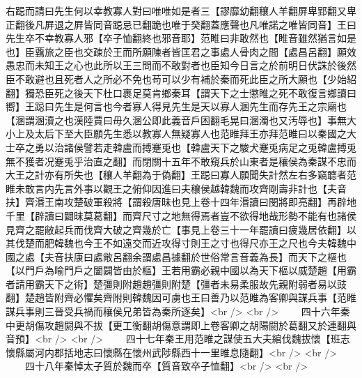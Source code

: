 右跽而請曰先生何以幸教寡人對曰唯唯如是者三【謬靡幼翻穰人羊翻屏卑郢翻又卑正翻後凡屛退之屛皆同音跽忌已翻跪也唯于癸翻蓋應聲也凡唯諾之唯皆同音】王曰先生卒不幸教寡人邪【卒子恤翻終也邪音耶】范睢曰非敢然也【睢音雖然猶言如是也】臣覊旅之臣也交疎於王而所願陳者皆匡君之事處人骨肉之間【處昌呂翻】願效愚忠而未知王之心也此所以王三問而不敢對者也臣知今日言之於前明日伏誅於後然臣不敢避也且死者人之所必不免也苟可以少有補於秦而死此臣之所大願也【少始紹翻】獨恐臣死之後天下杜口裹足莫肯鄉秦耳【謂天下之士懲睢之死不敢復言鄉讀曰嚮】王跽曰先生是何言也今者寡人得見先生是天以寡人溷先生而存先王之宗廟也【溷謂溷瀆之也漢陸賈曰毋久溷公即此義音戶困翻毛晃曰溷濁也又汚辱也】事無大小上及太后下至大臣願先生悉以教寡人無疑寡人也范睢拜王亦拜范睢曰以秦國之大士卒之勇以治諸侯譬若走韓盧而搏蹇兎也【韓盧天下之駿犬蹇兎病足之兎韓盧搏兎無不獲者况蹇兎乎治直之翻】而閉關十五年不敢窺兵於山東者是穰侯為秦謀不忠而大王之計亦有所失也【穰人羊翻為于偽翻】王跽曰寡人願聞失計然左右多竊聼者范睢未敢言内先言外事以觀王之俯仰因進曰夫穰侯越韓魏而攻齊剛壽非計也【夫音扶】齊湣王南攻楚破軍殺將【謂殺唐昧也見上卷十四年湣讀曰閔將即亮翻】再辟地千里【辟讀曰闢昧莫葛翻】而齊尺寸之地無得焉者豈不欲得地哉形勢不能有也諸侯見齊之罷敝起兵而伐齊大破之齊幾於亡【事見上卷三十一年罷讀曰疲幾居依翻】以其伐楚而肥韓魏也今王不如遠交而近攻得寸則王之寸也得尺亦王之尺也今夫韓魏中國之處【夫音扶康曰處敞呂翻余謂處昌據翻於世俗常言音義為長】而天下之樞也【以門戶為喻門戶之闔闢皆由於樞】王若用霸必親中國以為天下樞以威楚趙【用霸者請用霸天下之術】楚彊則附趙趙彊則附楚【彊者未易柔服故先親附弱者易以豉翻】楚趙皆附齊必懼矣齊附則韓魏因可虜也王曰善乃以范睢為客卿與謀兵事【范睢謀兵事則三晉受兵禍而穰侯兄弟皆為秦所逐矣】<br />
<br />
　　四十六年秦中更胡傷攻趙閼與不拔【更工衡翻胡傷意謂即上卷客卿之胡陽閼於葛翻又於連翻與音預】<br />
<br />
　　四十七年秦王用范睢之謀使五大夫綰伐魏拔懷【班志懷縣屬河内郡括地志曰懷縣在懷州武陟縣西十一里睢息隨翻】<br />
<br />
　　四十八年秦悼太子質於魏而卒【質音致卒子恤翻】<br />
<br />
